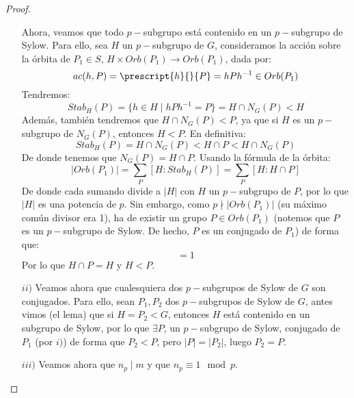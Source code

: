 \begin{teo}
\begin{proof}
\begin{enumerate}
                \noindent
                Ahora, veamos que todo $p-$subgrupo está contenido en un $p-$subgrupo de Sylow. Para ello, sea $H$ un $p-$subgrupo de $G$, consideramos la acción sobre la órbita de $P_1\in S$, $H\times Orb(P_1)\to Orb(P_1)$, dada por:
                \begin{equation*}
                    ac(h,P) = \prescript{h}{}{P} = hPh^{-1} \in Orb(P_1)
                \end{equation*}
                Tendremos:
                \begin{equation*}
                    Stab_H(P) = \{h\in H \mid hPh^{-1} = P\} = H\cap N_G(P) < H
                \end{equation*}
                Además, también tendremos que $H\cap N_G(P) < P$, ya que si $H$ es un $p-$subgrupo de $N_G(P)$, entonces $H<P$. En definitiva:
                \begin{equation*}
                    Stab_H(P) = H\cap N_G(P) < H\cap P < H\cap N_G(P)
                \end{equation*}
                De donde tenemos que $N_G(P) = H \cap P$. Usando la fórmula de la órbita: %
                \begin{equation*}
                    |Orb(P_1)| = \sum_{P} [H:Stab_H(P)] = \sum_{P} [H:H\cap P]
                \end{equation*}
                De donde cada sumando divide a $|H|$ con $H$ un $p-$subgrupo de $P$, por lo que $|H|$ es una potencia de $p$. Sin embargo, como $p \nmid |Orb(P_1)|$ (su máximo común divisor era 1), ha de existir un grupo $P\in Orb(P_1)$ (notemos que $P$ es un $p-$subgrupo de Sylow. De hecho, $P$ es un conjugado de $P_1$) de forma que:
                \begin{equation*}
                    [H:H\cap P] = 1
                \end{equation*}
                Por lo que $H\cap P = H$ y $H<P$.
            \item[$ii)$] Veamos ahora que cualesquiera dos $p-$subgrupos de Sylow de $G$ son conjugados. Para ello, sean $P_1,P_2$ dos $p-$subgrupos de Sylow de $G$, antes vimos (el lema) que si $H = P_2<G$, entonces $H$ está contenido en un subgrupo de Sylow, por lo que $\exists P$, un $p-$subgrupo de Sylow, conjugado de $P_1$ (por $i)$) de forma que $P_2 < P$, pero $|P| = |P_2|$, luego $P_2 = P$.
            \item[$iii)$] Veamos ahora que $n_p\mid m$ y que $n_p\equiv 1 \mod p$.\newline


\end{enumerate}
\end{proof}
\end{teo}
